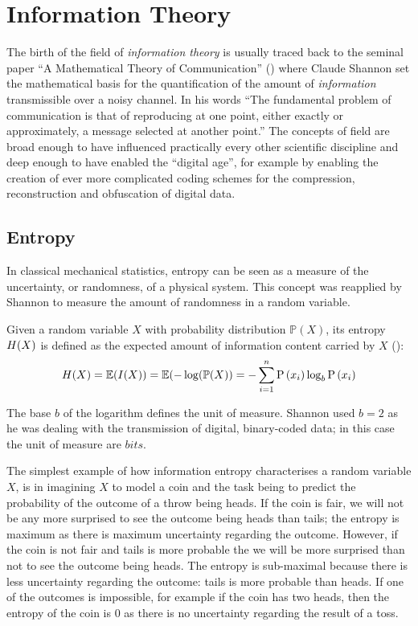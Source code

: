 \section{Information Theory} \label{sec:information-theory}
The birth of the field of \textit{information theory} is usually traced back to the seminal paper \enquote{A Mathematical Theory of Communication} (\cite{Shannon1949}) where Claude Shannon set the mathematical basis for the quantification of the amount of \textit{information} transmissible over a noisy channel. 
In his words \enquote{The fundamental problem of communication is that of reproducing at one point, either exactly or approximately, a message selected at another point.}
The concepts of field are broad enough to have influenced practically every other scientific discipline and deep enough to have enabled the \enquote{digital age}, for example by enabling the creation of ever more complicated coding schemes for the compression, reconstruction and obfuscation of digital data.

\subsection{Entropy} \label{subsec:entropy}
In classical mechanical statistics, entropy can be seen as a measure of the uncertainty, or randomness, of a physical system.  
This concept was reapplied by Shannon to measure the amount of randomness in a random variable.
\begin{definition}
	Given a random variable $X$ with probability distribution $\mathbb{P}(X)$, its entropy $H(X)$ is defined as the expected amount of information content carried by $X$ (\cite{Schneider2005}):
\begin{equation} \label{eq:entropy}
	H(X) = \mathbb{E}(I(X)) = \mathbb{E}(-\log (\mathbb{P}(X)) = -\sum_{i=1}^{n} \mathrm{P}\left(x_{i}\right) \log _{b} \mathrm{P}\left(x_{i}\right)
\end{equation}
\end{definition}
The base $b$ of the logarithm defines the unit of measure.  Shannon used $b=2$ as he was dealing with the transmission of digital, binary-coded data; in this case the unit of measure are $bits$.

The simplest example of how information entropy characterises a random variable $X$, is in imagining $X$ to model a coin and the task being to predict the probability of the outcome of a throw being heads.
If the coin is fair, we will not be any more surprised to see the outcome being heads than tails; the entropy is maximum as there is maximum uncertainty regarding the outcome.
However, if the coin is not fair and tails is more probable the we will be more surprised than not to see the outcome being heads.  
The entropy is sub-maximal because there is less uncertainty regarding the outcome: tails is more probable than heads.
If one of the outcomes is impossible, for example if the coin has two heads, then the entropy of the coin is $0$ as there is no uncertainty regarding the result of a toss.


